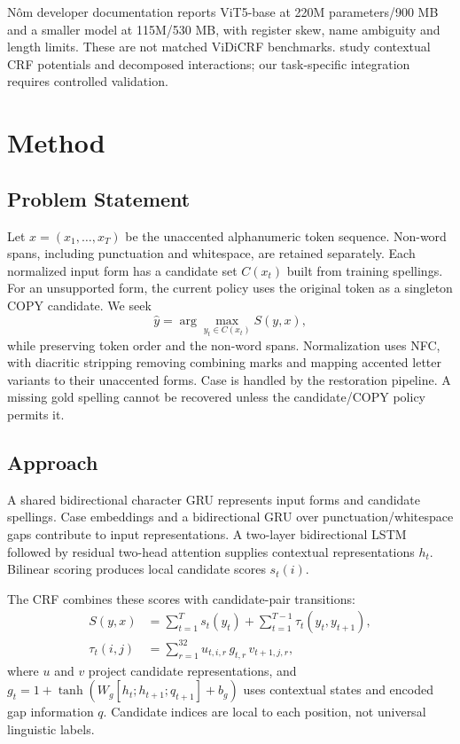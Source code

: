 \documentclass{article}
\begin{document}
N\^om developer documentation \citep{nom2026} reports ViT5-base at 220M parameters/900 MB and a smaller model at 115M/530 MB, with register skew, name ambiguity and length limits. These are not matched ViDiCRF benchmarks. \citet{hu2020} study contextual CRF potentials and decomposed interactions; our task-specific integration requires controlled validation.

\section{Method}
\subsection{Problem Statement}
Let $x=(x_1,\ldots,x_T)$ be the unaccented alphanumeric token sequence. Non-word spans, including punctuation and whitespace, are retained separately. Each normalized input form has a candidate set $C(x_t)$ built from training spellings. For an unsupported form, the current policy uses the original token as a singleton COPY candidate. We seek
\begin{equation}
\hat y=\arg\max_{y_t\in C(x_t)} S(y,x),
\end{equation}
while preserving token order and the non-word spans. Normalization uses NFC, with diacritic stripping removing combining marks and mapping accented letter variants to their unaccented forms. Case is handled by the restoration pipeline. A missing gold spelling cannot be recovered unless the candidate/COPY policy permits it.

\subsection{Approach}
A shared bidirectional character GRU represents input forms and candidate spellings. Case embeddings and a bidirectional GRU over punctuation/whitespace gaps contribute to input representations. A two-layer bidirectional LSTM followed by residual two-head attention supplies contextual representations $h_t$. Bilinear scoring produces local candidate scores $s_t(i)$.

The CRF combines these scores with candidate-pair transitions:
\begin{align}
S(y,x)&=\sum_{t=1}^{T}s_t(y_t)+\sum_{t=1}^{T-1}\tau_t(y_t,y_{t+1}),\\
\tau_t(i,j)&=\sum_{r=1}^{32}u_{t,i,r}\,g_{t,r}\,v_{t+1,j,r},
\end{align}
where $u$ and $v$ project candidate representations, and $g_t=1+\tanh(W_g[h_t;h_{t+1};q_{t+1}]+b_g)$ uses contextual states and encoded gap information $q$. Candidate indices are local to each position, not universal linguistic labels.
\end{document}
